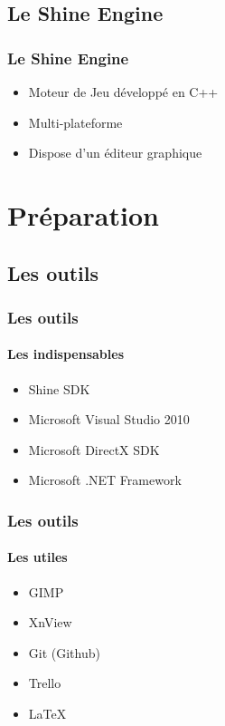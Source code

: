 \documentclass[12pt]{beamer}
\begin{document}
\subsection{Le Shine Engine}
\begin{frame}
\frametitle{Le Shine Engine}
\begin{itemize}
\item
Moteur de Jeu développé en C++
\item
Multi-plateforme 
\item
Dispose d'un éditeur graphique

\end{itemize}

\end{frame}



\section{Préparation}
\subsection{Les outils}
\begin{frame}
\frametitle{Les outils}
\framesubtitle{Les indispensables}


\begin{itemize}
\item
Shine SDK
\item
Microsoft Visual Studio 2010
\item
Microsoft DirectX SDK
\item
Microsoft .NET Framework

\end{itemize}

\end{frame}
\begin{frame}
\frametitle{Les outils}
\framesubtitle{Les utiles}

\begin{itemize}
\item
GIMP
\item
XnView
\item
Git (Github)
\item
Trello
\item
\LaTeX
\end{itemize}

\end{frame}
\end{document}
